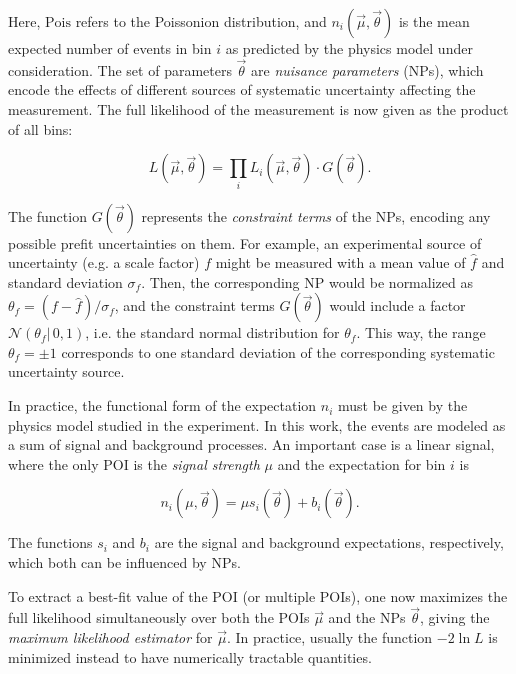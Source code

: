 Here, $\mathrm{Pois}$ refers to the Poissonion distribution, and $n_i (\vec{\mu}, \vec{\theta})$ is the mean expected number of events in bin $i$ as predicted by the physics model under consideration. The set of parameters $\vec{\theta}$ are \textit{nuisance parameters} (NPs), which encode the effects of different sources of systematic uncertainty affecting the measurement. The full likelihood of the measurement is now given as the product of all bins:

\begin{equation}
    L (\vec{\mu}, \vec{\theta}) = \prod_i L_i (\vec{\mu}, \vec{\theta}) \cdot G(\vec{\theta}).
\end{equation}

The function $G(\vec{\theta})$ represents the \textit{constraint terms} of the NPs, encoding any possible prefit uncertainties on them. For example, an experimental source of uncertainty (e.g. a scale factor) $f$ might be measured with a mean value of $\hat{f}$ and standard deviation $\sigma_f$. Then, the corresponding NP would be normalized as $\theta_f = (f-\hat{f})/\sigma_f$, and the constraint terms $G(\vec{\theta})$ would include a factor $\mathcal{N}(\theta_f | \, 0,1)$, i.e. the standard normal distribution for $\theta_f$. This way, the range $\theta_f = \pm 1$ corresponds to one standard deviation of the corresponding systematic uncertainty source.

In practice, the functional form of the expectation $n_i$ must be given by the physics model studied in the experiment. In this work, the events are modeled as a sum of signal and background processes. An important case is a linear signal, where the only POI is the \textit{signal strength} $\mu$ and the expectation for bin $i$ is

\begin{equation}
\label{eq:methods:linearsignal}
    n_i (\mu, \vec{\theta}) = \mu s_i (\vec{\theta}) + b_i (\vec{\theta}).
\end{equation}

The functions $s_i$ and $b_i$ are the signal and background expectations, respectively, which both can be influenced by NPs. 

To extract a best-fit value of the POI (or multiple POIs), one now maximizes the full likelihood simultaneously over both the POIs $\vec{\mu}$ and the NPs $\vec{\theta}$, giving the \textit{maximum likelihood estimator} for $\vec{\mu}$. In practice, usually the function $-2 \ln L$ is minimized instead to have numerically tractable quantities. 


